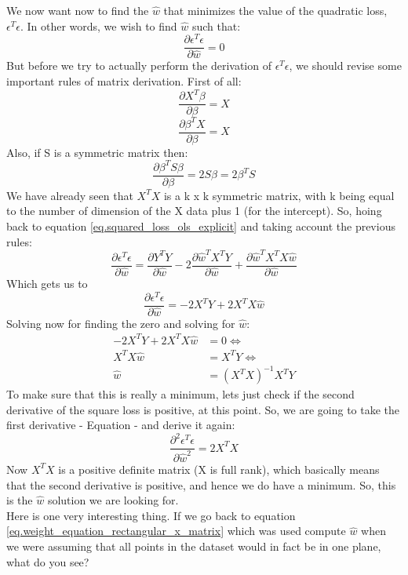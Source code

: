 We now want now to find the $\hat{w}$ that minimizes the value of the quadratic loss, $\epsilon^T \epsilon$. In other words, we wish to find $\hat{w}$ such that:
\begin{equation}
\frac{\partial \epsilon^T \epsilon}{\partial \hat{w}} = 0
\end{equation}
But before we try to actually perform the derivation of $ \epsilon^T \epsilon$, we should revise some important rules of matrix derivation. First of all:
\begin{equation}
\frac{\partial X^T\beta}{\partial \beta} = X
\end{equation}
\begin{equation}
\frac{\partial \beta^T X}{\partial \beta} = X
\end{equation}
Also, if S is a symmetric matrix then:
\begin{equation}
\frac{\partial \beta^T S \beta}{\partial \beta} = 2S\beta = 2\beta^TS
\end{equation}
We have already seen that $X^T X$ is a k x k symmetric matrix, with k being equal to the number of dimension of the X data plus 1 (for the intercept). So, hoing back to equation \ref{eq.squared_loss_ols_explicit} and taking account the previous rules:
\begin{equation}
\frac{\partial \epsilon^T \epsilon}{\partial \hat{w}} = 
\frac{\partial Y^{T}Y}{\partial \hat{w}} - 2
\frac{\partial \hat{w}^TX^TY}{\partial \hat{w}} +
\frac{\partial \hat{w}^TX^T X \hat{w}}{\partial \hat{w}}
\end{equation}
Which gets us to
\begin{equation}
\frac{\partial \epsilon^T \epsilon}{\partial \hat{w}} = -2 X^T Y + 2 X^T X \hat{w}
\label{eq.first_derivative_square_loss}
\end{equation}
Solving now for finding the zero and solving for $\hat{w}$:
\begin{align*} 
-2 X^T Y + 2 X^T X \hat{w} &= 0 \Leftrightarrow \\
X^T X \hat{w} &= X^T Y \Leftrightarrow \\
\hat{w} &= (X^T X)^{-1} X^T Y
\end{align*}
To make sure that this is really a minimum, lets just check if the second derivative of the square loss is positive, at this point. So, we are going to take the first derivative - Equation \label{eq.first_derivative_square_loss} - and derive it again:
\begin{equation}
\frac{\partial^2 \epsilon^T \epsilon}{\partial \hat{w}^2} = 2 X^T X
\end{equation}
Now $X^T X$ is a positive definite matrix (X is full rank), which basically means that the second derivative is positive, and hence we do have a minimum. So, this is the $\hat{w}$ solution we are looking for.
\\

Here is one very interesting thing. If we go back to equation \ref{eq.weight_equation_rectangular_x_matrix} which was used compute $\hat{w}$ when we were assuming that all points in the dataset would in fact be  in one plane, what do you see?


